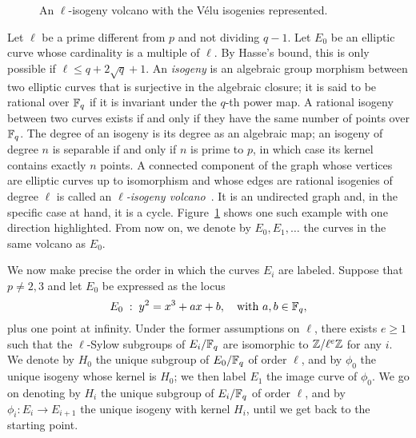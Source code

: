 \documentclass{sig-alternate}
\begin{document}
\begin{figure}
  \centering
  \caption{An $\ell$-isogeny volcano with the Vélu isogenies
    represented.}
  \label{fig:volcano}
\end{figure}

Let $\ell$ be a prime different from $p$ and not dividing $q-1$. Let
$E_0$ be an elliptic curve whose cardinality is a multiple of
$\ell$. By Hasse's bound, this is only possible if $\ell\le q +
2\sqrt{q} + 1$. An \emph{isogeny} is an algebraic group morphism
between two elliptic curves that is surjective in the algebraic
closure; it is said to be rational over $\mathbb{F}_q$ if it is invariant
under the $q$-th power map. A rational isogeny between two curves
exists if and only if they have the same number of points over
$\mathbb{F}_q$. The degree of an isogeny is its degree as an algebraic map; an
isogeny of degree $n$ is separable if and only if $n$ is prime to $p$,
in which case its kernel contains exactly $n$ points. A connected
component of the graph whose vertices are elliptic curves up to
isomorphism and whose edges are rational isogenies of degree $\ell$ is
called an \emph{$\ell$-isogeny
  volcano}~\cite{kohel,fouquet+morain02}. It is an undirected graph
and, in the specific case at hand, it is a cycle.
Figure~\ref{fig:volcano} shows one such example with one direction
highlighted. From now on, we denote by $E_0,E_1,\dots$ the curves in
the same volcano as $E_0$.

We now make precise the order in which the curves $E_i$ are
labeled. Suppose that $p\ne2,3$ and let $E_0$ be expressed as the
locus
\begin{equation}
  E_0 \;:\; y^2 = x^3 + ax + b,
  \quad\text{with $a,b\in\mathbb{F}_q$},
\end{equation}
plus one point at infinity. Under the former assumptions on $\ell$,
there exists $e\ge1$ such that the $\ell$-Sylow subgroups of
$E_i/\mathbb{F}_q$ are isomorphic to $\mathbb{Z}/\ell^e\mathbb{Z}$ for any $i$. We denote by
$H_0$ the unique subgroup of $E_0/\mathbb{F}_q$ of order $\ell$, and by
$\phi_0$ the unique isogeny whose kernel is $H_0$; we then label $E_1$
the image curve of $\phi_0$. We go on denoting by $H_i$ the unique
subgroup of $E_i/\mathbb{F}_q$ of order $\ell$, and by $\phi_i:E_i\to E_{i+1}$
the unique isogeny with kernel $H_i$, until we get back to the
starting point.
\end{document}
